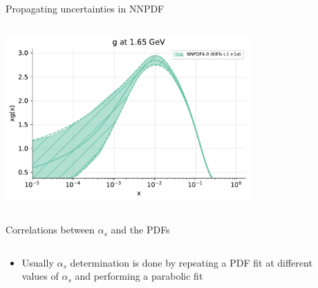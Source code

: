 \documentclass[8pt,t]{beamer}
\begin{document}
\begin{frame}{Propagating uncertainties in NNPDF}
\begin{columns}
\begin{column}{0.49\textwidth}
\begin{center}
        \includegraphics[width=0.7\textwidth]{band_g.pdf}
      \end{center}
    \end{column}
  \end{columns}
\end{frame}




\begin{frame}{Correlations between $\alpha_s$ and the PDFs}
  \begin{columns}[T]
    \begin{column}{0.49\textwidth}
      \begin{itemize}
        \item Usually $\alpha_s$ determination is done by repeating a PDF fit at different values of $\alpha_s$ and performing a parabolic fit
      \end{itemize}
    \end{column}
    \begin{column}{0.49\textwidth}
    \end{column}
  \end{columns}
\end{frame}
\end{document}
